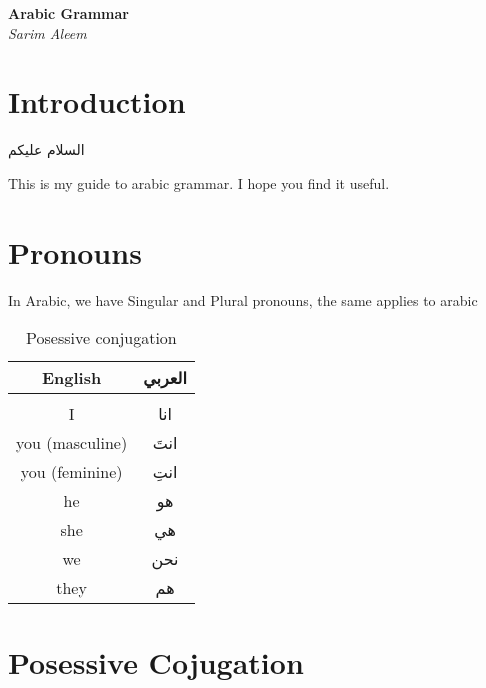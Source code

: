\documentclass{article}
\begin{document}
\begin{titlepage}
   \begin{center}
      \Large\textbf{Arabic Grammar}\\
      \large\textit{Sarim Aleem}
   \end{center}
\end{titlepage}

\section{Introduction}

\begin{Arabic}
    السلام عليكم
\end{Arabic}

This is my guide to arabic grammar. I hope you find it useful.

\section{Pronouns}
In Arabic, we have Singular and Plural pronouns, the same applies to arabic

\begin{table}[H]
    \caption{Posessive conjugation}
    \label{tab:}
    \begin{center}
        \begin{tabular}{c c}
            English         & \textarabic{العربي} \\
            \hline
            \\
            I              & \textarabic{انا} \\
            you (masculine) & \textarabic{انتَ} \\
            you (feminine)& \textarabic{انتِ} \\
            he             & \textarabic{هو} \\
            she             & \textarabic{هي} \\
            we             & \textarabic{نحن} \\
            they           & \textarabic{هم} \\
        \end{tabular}
    \end{center}
\end{table}

\section{Posessive Cojugation}
\end{document}
